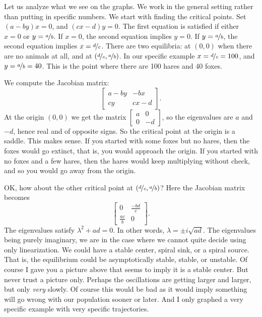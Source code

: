 Let us analyze what we see on the graphs.  We work in the general
setting rather than putting in specific numbers.  We start with finding
the critical points.  Set $(a-by)x = 0$, and $(cx-d)y = 0$.
The first equation is satisfied if either $x=0$ or $y=\nicefrac{a}{b}$.  If $x=0$, the
second equation implies $y=0$.  If $y= \nicefrac{a}{b}$, the second equation implies
$x=\nicefrac{d}{c}$.
There are two equilibria: at $(0,0)$ when there are no animals at all, and at
$(\nicefrac{d}{c},\nicefrac{a}{b})$.  
In our specific example $x = \nicefrac{d}{c} = 100$, and $y = \nicefrac{a}{b} = 40$.
This is the point where there are 100 hares and 40 foxes.

We compute the Jacobian matrix:
\begin{equation*}
\begin{bmatrix}
a-by & -bx \\
cy & cx-d
\end{bmatrix} .
\end{equation*}
At the origin $(0,0)$ we get the matrix
$\left[ \begin{smallmatrix}
a & 0 \\
0 & -d
\end{smallmatrix} \right]$, so the eigenvalues are $a$ and $-d$, hence real
and of opposite signs.  So the critical point at the origin is a saddle.
This makes sense.  If you started with some foxes but no hares, then the
foxes would go extinct, that is, you would approach the origin.  If you
started with no foxes and a few hares, then the hares would keep multiplying
without check, and so you would go away from the origin.

OK\@, how about the other critical point at $(\nicefrac{d}{c},\nicefrac{a}{b})$?  Here
the Jacobian matrix becomes
\begin{equation*}
\begin{bmatrix}
0 & \frac{-bd}{c} \\
\frac{ac}{b} & 0
\end{bmatrix} .
\end{equation*}
The eigenvalues satisfy $\lambda^2 + ad = 0$.  In
other words, $\lambda = \pm i \sqrt{ad}$.  The eigenvalues being
purely imaginary, we are in the case where we cannot quite decide using only
linearization.  We could
have a stable center, spiral sink, or a spiral source.  That is, the
equilibrium could be asymptotically stable, stable, or unstable.  Of
course I gave you a picture above that seems to imply it is a stable
center.  But never trust a picture only.  Perhaps the oscillations
are getting larger and larger, but only \emph{very} slowly.  Of course this would be
bad as it would imply something will go wrong with our population
sooner or later.  And I only graphed a very specific example with very
specific trajectories.

